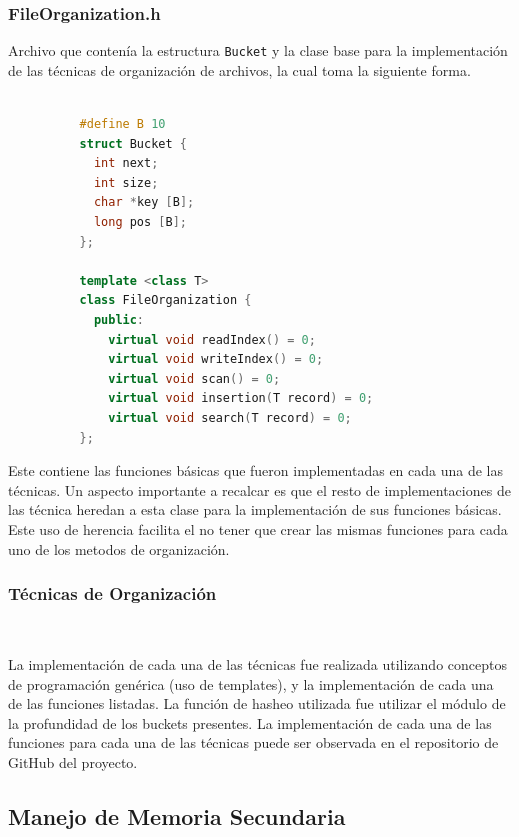 \documentclass{article}
\begin{document}
      \subsubsection{FileOrganization.h}
      
        Archivo que contenía la estructura \texttt{Bucket} y la clase base para la implementación de las técnicas de organización de archivos, la cual toma la siguiente forma. 

        \begin{lstlisting}[language=C++]
        
          #define B 10
          struct Bucket {
            int next;
            int size;
            char *key [B];
            long pos [B];
          };

          template <class T>
          class FileOrganization {
            public:
              virtual void readIndex() = 0;
              virtual void writeIndex() = 0;
              virtual void scan() = 0;
              virtual void insertion(T record) = 0;
              virtual void search(T record) = 0;
          };

        \end{lstlisting}
        
          Este contiene las funciones básicas que fueron implementadas en cada una de las técnicas. Un aspecto importante a recalcar es que el resto de implementaciones de las técnica heredan a esta clase para la implementación de sus funciones básicas. Este uso de herencia facilita el no tener que crear las mismas funciones para cada uno de los metodos de organización. 

      \subsubsection{Técnicas de Organización} 
        
        La implementación de cada una de las técnicas fue realizada utilizando conceptos de programación genérica (uso de templates), y la implementación de cada una de las funciones listadas. La función de hasheo utilizada fue utilizar el módulo de la profundidad de los buckets presentes. La implementación de cada una de las funciones para cada una de las técnicas puede ser observada en el repositorio de GitHub del proyecto.

    \subsection{Manejo de Memoria Secundaria}
\end{document}

